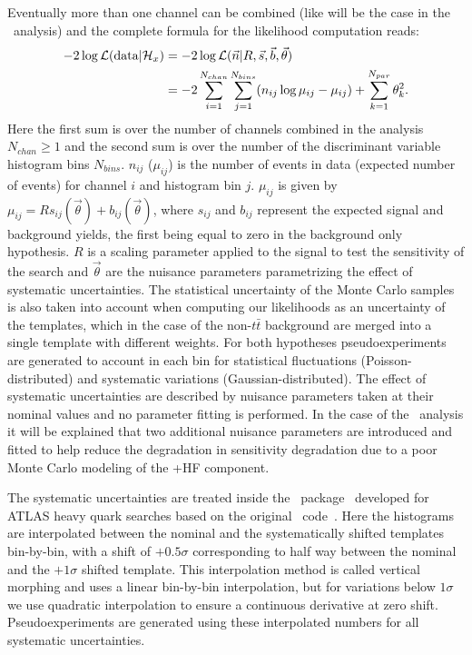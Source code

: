 Eventually more than one channel can be combined (like will be
the case in the \htx\ analysis) and the complete formula for
the likelihood computation reads:
\begin{align}
-2 \log {\cal L}({\rm data}|\mathcal{H}_x) 
   & =  
   -2 \log {\cal L}(\vec{n}|R,\vec{s},\vec{b},\vec{\theta}) \notag\\
   & =  
  -2 \sum_{i=1}^{N_{chan}}\sum_{j=1}^{N_{bins}} (n_{ij}\log \mu_{ij}-\mu_{ij})+\sum_{k=1}^{N_{par}} \theta_k^2.
\end{align}
Here the first sum is over the number of channels
combined in the analysis $N_{chan}\geq 1$ and the 
second sum is over the number of the discriminant variable
histogram bins $N_{bins}$. $n_{ij}$ ($\mu_{ij}$) is the 
number of events in data (expected number of events) 
for channel $i$ and histogram bin $j$. $\mu_{ij}$ is given by
$\mu_{ij} = R s_{ij}(\vec{\theta})+ b_{ij}(\vec{\theta})$, 
where $s_{ij}$  and $b_{ij}$ represent the
expected signal and background yields, 
the first being equal to zero in the background only hypothesis.
$R$ is a scaling 
parameter applied to the signal
to test the sensitivity of the search and $\vec{\theta}$
are the nuisance parameters parametrizing the effect of
systematic uncertainties. 
The statistical uncertainty of the Monte Carlo samples is 
also taken into account when computing our likelihoods as
an uncertainty of the templates, which in the case of
the non-$t\bar{t}$ background are merged into a single
template  with different weights.
For both hypotheses pseudoexperiments are generated to
account in each bin for statistical fluctuations (Poisson-distributed)
and systematic variations (Gaussian-distributed). The effect of
systematic uncertainties are described by nuisance parameters taken
at their nominal values and no parameter fitting is performed.
In the case of the \htx\ analysis it will be explained that
two additional nuisance parameters are introduced and fitted
to help reduce the degradation in sensitivity degradation due to a poor
Monte Carlo modeling of the \ttbar+HF component.


The systematic uncertainties are treated inside the \mclimit\ 
package~\cite{mclimitATLAS} developed for ATLAS heavy quark
searches based on the original \mclimit\ code~\cite{Heinrich:7587,Junk:8128,Junk:7904}.
Here the  histograms are interpolated between the nominal and the 
systematically shifted templates bin-by-bin, with a shift of $+0.5\sigma$
corresponding to half way between the nominal and the $+1\sigma$ shifted template.
This interpolation method is called vertical morphing and uses a linear 
bin-by-bin interpolation, but for variations below $1\sigma$ we use
quadratic interpolation to ensure a continuous derivative at zero shift.
Pseudoexperiments are generated using these interpolated numbers for
all systematic uncertainties.



